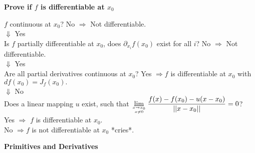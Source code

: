 \documentclass[]{article}
\begin{document}
\begin{multicols*}{3}
\textbf{Prove if $f$ is differentiable at $x_0$}

$f$ continuous at $x_0$? No $\Rightarrow$ Not differentiable.\\
$\Downarrow$ Yes\\
Is $f$ partially differentiable at $x_0$, does $\partial_{x_i}f(x_0)$ exist for all $i$?
No $\Rightarrow$ Not differentiable.\\
$\Downarrow$ Yes\\
Are all partial derivatives continuous at $x_0$? Yes $\Rightarrow f$ is differentiable at $x_0$ with $df(x_0)=J_f(x_0).$\\
$\Downarrow$ No\\
Does a linear mapping $u$ exist, such that 
$\displaystyle\lim_{x\rightarrow x_0 \atop x\neq 0} \frac{f(x)-f(x_0)-u(x-x_0)}{||x-x_0||}=0$?\\
Yes $\Rightarrow$ $f$ is differentiable at $x_0$.\\
No $\Rightarrow f$ is not differentiable at $x_0$ *cries*.

\textbf{Primitives and Derivatives}


\end{multicols*}
\end{document}
